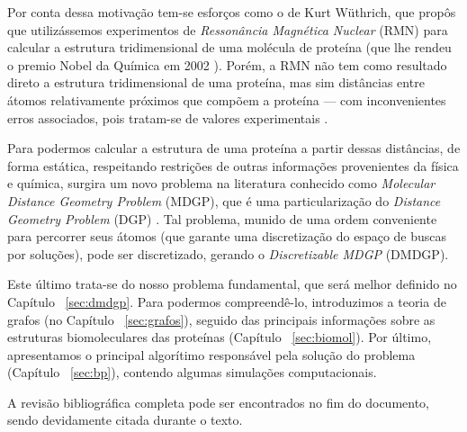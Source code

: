 \documentclass[a4paper,12pt]{article}
\begin{document}
	Por conta dessa motivação tem-se esforços como o de Kurt Wüthrich, que propôs que utilizássemos experimentos de \textit{Ressonância Magnética Nuclear}
	(RMN) para calcular a estrutura tridimensional de uma molécula de proteína (que lhe rendeu o premio Nobel da Química em 2002 \cite{RMNproteinWrutrich}). Porém, a RMN não tem como resultado direto a estrutura tridimensional de uma proteína, mas sim distâncias entre átomos relativamente próximos que compõem a proteína --- com inconvenientes erros associados, pois tratam-se de valores experimentais \cite{carlile:MinimalOrder}.
	
	Para podermos calcular a estrutura de uma proteína a partir dessas distâncias, de forma estática, respeitando restrições de outras informações provenientes da física e química, surgira um novo problema na literatura conhecido como \textit{Molecular Distance Geometry Problem} (MDGP), que é uma particularização do \textit{Distance Geometry Problem} (DGP) \cite{carlileGDandAplications}. Tal problema, munido de uma ordem conveniente para percorrer seus átomos (que garante uma discretização do espaço de buscas por soluções), pode ser discretizado, gerando o \textit{Discretizable MDGP} (DMDGP).
	
	Este último trata-se do nosso problema fundamental, que será melhor definido no Capítulo ~\ref{sec:dmdgp}. Para podermos compreendê-lo, introduzimos a teoria de grafos (no Capítulo ~\ref{sec:grafos}), seguido das principais informações sobre as estruturas biomoleculares das proteínas (Capítulo ~\ref{sec:biomol}). Por último, apresentamos o principal algorítimo responsável pela solução do problema (Capítulo ~\ref{sec:bp}), contendo algumas simulações computacionais.
	
	A revisão bibliográfica completa pode ser encontrados no fim do documento, sendo devidamente citada durante o texto. 
	
	\newpage
	
	
	
	\newpage
	
	

	
	
	
	
	\newpage
	\appendix
	
\end{document}
